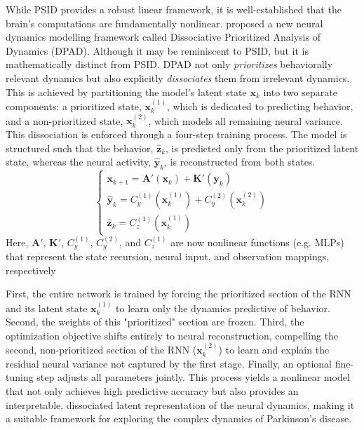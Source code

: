 \documentclass[12pt, a4paper]{article}
\begin{document}
While PSID provides a robust linear framework, it is well-established that the brain's computations are fundamentally nonlinear. \textcite{saniDissociativePrioritizedModeling2024} proposed a new neural dynamics modelling framework called Dissociative Prioritized Analysis of Dynamics (DPAD). Although it may be reminiscent to PSID, but it is mathematically distinct from PSID. DPAD not only \textit{prioritizes} behaviorally relevant dynamics but also explicitly \textit{dissociates} them from irrelevant dynamics. This is achieved by partitioning the model's latent state $\mathbf{x}_k$ into two separate components: a prioritized state, $\mathbf{x}_k^{(1)}$, which is dedicated to predicting behavior, and a non-prioritized state, $\mathbf{x}_k^{(2)}$, which models all remaining neural variance.
This dissociation is enforced through a four-step training process. The model is structured such that the behavior, $\hat{\mathbf{z}}_k$, is predicted only from the prioritized latent state, whereas the neural activity, $\hat{\mathbf{y}}_k$, is reconstructed from both states.
$$
    \begin{cases}
        \mathbf{x}_{k+1} = \mathbf{A}'(\mathbf{x}_k) + \mathbf{K}'(\mathbf{y}_k)           \\
        \hat{\mathbf{y}}_k = C_y^{(1)}(\mathbf{x}_k^{(1)}) + C_y^{(2)}(\mathbf{x}_k^{(2)}) \\
        \hat{\mathbf{z}}_k = C_z^{(1)}(\mathbf{x}_k^{(1)})
    \end{cases}
$$
Here, $\mathbf{A}'$, $\mathbf{K}'$, $C_y^{(1)}$, $C_y^{(2)}$, and $C_z^{(1)}$ are now nonlinear functions (e.g. MLPs) that represent the state recursion, neural input, and observation mappings, respectively

First, the entire network is trained by forcing the prioritized section of the RNN and its latent state $\mathbf{x}_k^{(1)}$ to learn only the dynamics predictive of behavior. Second, the weights of this "prioritized" section are frozen. Third, the optimization objective shifts entirely to neural reconstruction, compelling the second, non-prioritized section of the RNN ($\mathbf{x}_k^{(2)}$) to learn and explain the residual neural variance not captured by the first stage. Finally, an optional fine-tuning step adjusts all parameters jointly. This process yields a nonlinear model that not only achieves high predictive accuracy but also provides an interpretable, dissociated latent representation of the neural dynamics, making it a suitable framework for exploring the complex dynamics of Parkinson's disease.
\end{document}
